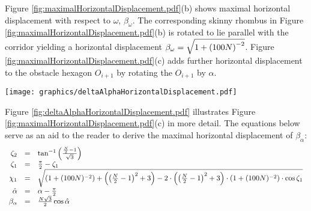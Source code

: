 Figure \ref{fig:maximalHorizontalDisplacement.pdf}(b) shows maximal horizontal displacement with respect to $\omega$, $\beta_\omega$.  
The corresponding skinny rhombus in Figure \ref{fig:maximalHorizontalDisplacement.pdf}(b) is rotated to lie parallel with the corridor yielding a horizontal displacement $\beta_\omega = \sqrt{1 + \left( 100N \right)^{-2} }$.  
Figure \ref{fig:maximalHorizontalDisplacement.pdf}(c) adds further horizontal displacement to the obstacle hexagon $O_{i+1}$ by rotating the $O_{i+1}$ by $\alpha$.  

\begin{minipage}{\linewidth}
\begin{center}
\texttt{[image: graphics/deltaAlphaHorizontalDisplacement.pdf]}
\label{fig:deltaAlphaHorizontalDisplacement.pdf}
\end{center}
\end{minipage}

Figure \ref{fig:deltaAlphaHorizontalDisplacement.pdf} illustrates Figure \ref{fig:maximalHorizontalDisplacement.pdf}(c) in more detail.  
The equations below serve as an aid to the reader to derive the maximal horizontal displacement of $\beta_\alpha$:
$$
\begin{array}{rcl}
\zeta_2 &=& \tan^{-1} \left( \frac{\frac{N}{2}-1}{\sqrt{3}} \right)\\
\zeta_1 &=& \frac{\pi}{2} - \zeta_1\\
\chi_1 &=& \sqrt{\left( 1+(100N)^{-2} \right) + \left( \left( \frac{N}{2}-1 \right)^2 + 3 \right) - 2 \cdot \left( \left( \frac{N}{2}-1 \right)^2 + 3 \right)\cdot \left( 1+(100N)^{-2} \right)  \cdot \cos \zeta_1       }\\
\hat{\alpha} &=& \alpha - \frac{\pi}{2}\\
\beta_\alpha &=& \frac{N\sqrt{3}}{2} \cos \hat{\alpha}
\end{array}
$$

